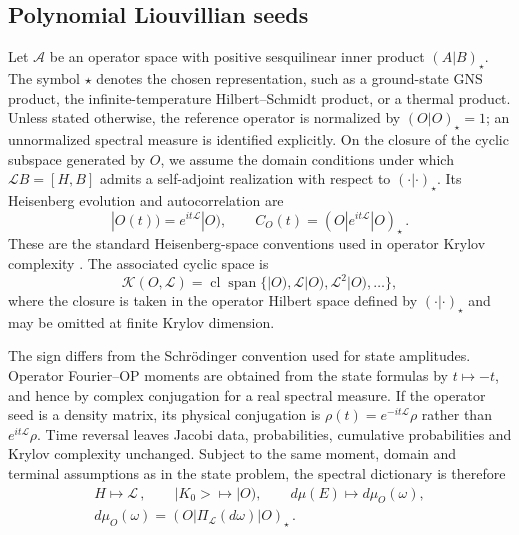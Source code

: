 \documentclass[a4paper,11pt]{article}
\def\ket#1{|#1>}%
\def\dd{d}%
\def\ii{i}%
\def\ee{e}%
\theoremstyle{definition}
\theoremstyle{remark}
\newcommand{\ket}[1]{|#1\rangle}
\newcommand{\dd}{\mathrm d}
\newcommand{\ii}{\mathrm i}
\newcommand{\ee}{\mathrm e}
\newcommand{\Span}{\operatorname{span}}
\begin{document}
\subsection{Polynomial Liouvillian seeds}
\label{app:operator-polynomial-seeds}

Let $\mathcal A$ be an operator space with positive sesquilinear inner
product $(A|B)_\star$.  The symbol $\star$ denotes the chosen
representation, such as a ground-state GNS product, the
infinite-temperature Hilbert--Schmidt product, or a thermal product.
Unless stated otherwise, the reference operator is normalized by
$(O|O)_\star=1$; an unnormalized spectral measure is identified
explicitly.  On the closure of the cyclic subspace generated by $O$, we
assume the domain conditions under which
$
   \mathcal L B=[H,B]
$ 
admits a self-adjoint realization with respect to
$(\cdot|\cdot)_\star$.  Its Heisenberg evolution and autocorrelation are
\begin{equation}
   |O(t))=\ee^{\ii t\mathcal L}|O),
   \qquad
   C_O(t)=(O|\ee^{\ii t\mathcal L}|O)_\star\,.
\end{equation}
These are the standard Heisenberg-space conventions used in operator
Krylov complexity \cite{Parker2019,Nandy2024,Rabinovici2025}.
The associated cyclic space is
\begin{equation}
   \mathcal K(O,\mathcal L)
   =
   \operatorname{cl}\!\Span\{|O),\mathcal L|O),
      \mathcal L^2|O),\ldots\},
   \label{eq:operator-krylov-space-app}
\end{equation}
where the closure is taken in the operator Hilbert space defined by
$(\cdot|\cdot)_\star$ and may be omitted at finite Krylov dimension.

The sign differs from the Schr\"odinger convention used for state
amplitudes.  Operator Fourier--OP moments are obtained from the state
formulas by $t\mapsto-t$, and hence by complex conjugation for a real
spectral measure.  If the operator seed is a density matrix, its physical
conjugation is
$\rho(t)=\ee^{-\ii t\mathcal L}\rho$ rather than
$\ee^{\ii t\mathcal L}\rho$.  Time reversal leaves Jacobi data,
probabilities, cumulative probabilities and Krylov complexity unchanged.
Subject to the same moment, domain and terminal assumptions as in the
state problem, the spectral dictionary is therefore
\begin{equation}
\begin{gathered}
   H\longmapsto\mathcal L\,,
   \qquad
   \ket{K_0}\longmapsto |O),
   \qquad
   \dd\mu(E)\longmapsto\dd\mu_O(\omega),\\
   \dd\mu_O(\omega)
   =(O|\Pi_{\mathcal L}(\dd\omega)|O)_\star\,.
\end{gathered}
   \label{eq:operator-dictionary-app}
\end{equation}
\end{document}
